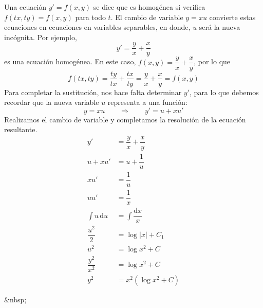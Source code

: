 \begin{ejemplo}
Una ecuación $y'=f(x,y)$ se dice que es homogénea si verifica $f(tx,ty)=f(x,y)$ para todo $t$.
El cambio de variable $y=xu$ convierte estas ecuaciones en ecuaciones en variables separables, en donde, $u$ será la nueva incógnita.
Por ejemplo,
\begin{equation}\label{ej:ecdhomo}
y'=\dfrac{y}x+\dfrac{x}y
\end{equation}
es una ecuación homogénea.
En este caso, $f(x,y)=\dfrac{y}x+\dfrac{x}y$, por lo que
\[
f(tx,ty)= \dfrac{ty}{tx}+\dfrac{tx}{ty} =\dfrac{y}x+\dfrac{x}y=f(x,y)
\]
Para completar la sustitución, nos hace falta determinar $y'$, para lo que debemos recordar que la nueva variable $u$ representa a una función:
\[
y=xu \qquad \Longrightarrow \qquad
y' = u+xu'
\]
Realizamos el cambio de variable y completamos la resolución de la ecuación resultante.
\begin{align*}
y' & =\dfrac{y}x+\dfrac{x}y \\
u+xu' &= u +\dfrac1u \\
xu' &= \dfrac1u \\
uu' &= \dfrac1x \\
\int u\,\mathrm du &= \int\dfrac{\mathrm dx}x \\
\dfrac{u^2}2 &= \log|x| +C_1 \\
u^2 &= \log x^2 +C  \\
\dfrac{y^2}{x^2} &= \log x^2 +C  \\
y^2&= x^2(\log x^2 +C) \tag*{\fej}
\end{align*}
\end{ejemplo}
\begin{rawhtml}
&nbsp;
\end{rawhtml}
